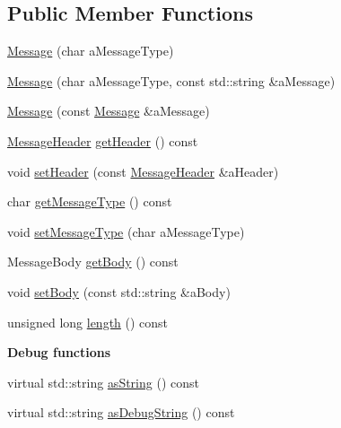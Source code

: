 \subsection*{Public Member Functions}
\begin{DoxyCompactItemize}
\item 
\hyperlink{struct_messaging_1_1_message_ae70b36c0c4ec25e5e622202efaf82513}{Message} (char a\+Message\+Type)
\item 
\hyperlink{struct_messaging_1_1_message_a0771c811ee4035a8fea938b1e79fbfce}{Message} (char a\+Message\+Type, const std\+::string \&a\+Message)
\item 
\hyperlink{struct_messaging_1_1_message_ad8b7c8ca68f83e15e37d8caf28797cbf}{Message} (const \hyperlink{struct_messaging_1_1_message}{Message} \&a\+Message)
\item 
\hyperlink{struct_messaging_1_1_message_1_1_message_header}{Message\+Header} \hyperlink{struct_messaging_1_1_message_abb173c7d9557a5dc08aae8e7b114d87d}{get\+Header} () const 
\item 
void \hyperlink{struct_messaging_1_1_message_aa5d6274a086f01a52853a0536316402e}{set\+Header} (const \hyperlink{struct_messaging_1_1_message_1_1_message_header}{Message\+Header} \&a\+Header)
\item 
char \hyperlink{struct_messaging_1_1_message_af035748b0a1426a8b73f74d85f120be0}{get\+Message\+Type} () const 
\item 
void \hyperlink{struct_messaging_1_1_message_a9a63d50cbf443564d6092d532495f95f}{set\+Message\+Type} (char a\+Message\+Type)
\item 
Message\+Body \hyperlink{struct_messaging_1_1_message_a83ac5ea677d87bc22d56c545bf61127e}{get\+Body} () const 
\item 
void \hyperlink{struct_messaging_1_1_message_abedc9083e15715ad417043e6c483818e}{set\+Body} (const std\+::string \&a\+Body)
\item 
unsigned long \hyperlink{struct_messaging_1_1_message_a61baa8ab016b7b6d07ceade6268db5af}{length} () const 
\end{DoxyCompactItemize}
\begin{Indent}{\bf Debug functions}\par
\begin{DoxyCompactItemize}
\item 
virtual std\+::string \hyperlink{struct_messaging_1_1_message_ac20fb163de9035e2050a04de9ad176d5}{as\+String} () const 
\item 
virtual std\+::string \hyperlink{struct_messaging_1_1_message_a179ec6c4dc374ca0035aa5141522756f}{as\+Debug\+String} () const 
\end{DoxyCompactItemize}
\end{Indent}

